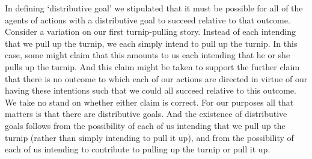 \documentclass[12pt,\papersize]{extarticle}
\begin{document}

In defining `distributive goal' we stipulated that it must be possible for all of the agents of actions with a distributive goal to succeed relative to that outcome.
Consider a variation on our first turnip-pulling story.
Instead of each intending that we pull up the turnip,
we each simply intend  to pull up the turnip.
In this case,
some might claim that
this amounts to us each intending that he or she pulls up the turnip.
And this claim might be taken to support the further claim that
there is no outcome to which each of our actions are directed
in virtue of our having these intentions
such that we could all succeed relative to this outcome.
We take no stand on whether either claim is correct.
For our purposes all that matters is that there are distributive goals.
And the existence of distributive goals follows from the possibility of each of us 
intending that we pull up the turnip
(rather than simply
intending to pull it up),
and from the possibility of each of us
intending to contribute to pulling up the turnip or pull it up.
\end{document}
